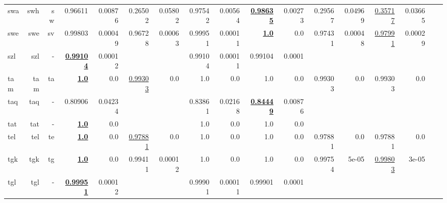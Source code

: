 \documentclass[11pt]{article}
\begin{document}
\begin{table*}[h]
{\begin{tabular}{lrrrrrrrrrrrrrrrr}
swa         & swh         & sw         & 0.96611         & 0.00876         & 0.26502         & 0.05802         & 0.97542         & 0.00564         & \textbf{\underline{0.98635}}         & 0.00273         & 0.29567         & 0.04969         & \underline{0.35717}         & 0.03665         \\
swe         & swe         & sv         & 0.99803         & 0.00049         & 0.96728         & 0.00063         & 0.99951         & 0.00011         & \textbf{\underline{1.0}}         & 0.0         & 0.97431         & 0.00048         & \underline{0.97991}         & 0.00029         \\
szl         & szl         & -         & \textbf{\underline{0.99104}}         & 0.00012         &          &          & 0.99104         & 0.00011         & 0.99104         & 0.0001         &          &          &          &          \\
tam         & tam         & ta         & \textbf{\underline{1.0}}         & 0.0         & \underline{0.99303}         & 0.0         & 1.0         & 0.0         & 1.0         & 0.0         & 0.99303         & 0.0         & 0.99303         & 0.0         \\
taq         & taq         & -         & 0.80906         & 0.04234         &          &          & 0.83861         & 0.02168         & \textbf{\underline{0.84449}}         & 0.00876         &          &          &          &          \\
tat         & tat         & -         & \textbf{\underline{1.0}}         & 0.0         &          &          & 1.0         & 0.0         & 1.0         & 0.0         &          &          &          &          \\
tel         & tel         & te         & \textbf{\underline{1.0}}         & 0.0         & \underline{0.97881}         & 0.0         & 1.0         & 0.0         & 1.0         & 0.0         & 0.97881         & 0.0         & 0.97881         & 0.0         \\
tgk         & tgk         & tg         & \textbf{\underline{1.0}}         & 0.0         & 0.99411         & 0.00012         & 1.0         & 0.0         & 1.0         & 0.0         & 0.99754         & 5e-05         & \underline{0.99803}         & 3e-05         \\
tgl         & tgl         & -         & \textbf{\underline{0.99951}}         & 0.00012         &          &          & 0.99901         & 0.00011         & 0.99901         & 0.0001         &          &          &          &          \\

\end{tabular}}
\end{table*}
\end{document}
